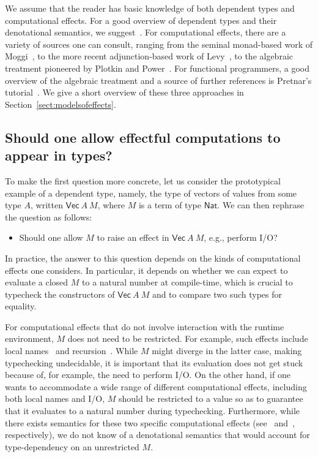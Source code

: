 We assume that the reader has basic knowledge of both dependent types and computational effects. For a good overview of dependent types and their denotational semantics, we suggest~\cite{Hofmann:SyntaxAndSemantics,Jacobs:Book,Streicher:Semantics}. 
For computational effects, there are a variety of sources one can consult, ranging from the seminal monad-based work of Moggi~\cite{Moggi:ComputationalLambdaCalculus,Moggi:NotionsofComputationandMonads}, to the more  recent adjunction-based work of Levy~\cite{Levy:CBPV}, to the algebraic treatment pioneered by Plotkin and Power~\cite{Plotkin:SemanticsForAlgOperations,Plotkin:NotionsOfComputation}. For functional programmers, a good overview of the algebraic treatment and a source of further references is Pretnar's tutorial~\cite{Pretnar:Tutorial}. 
We give a short overview of these three approaches 
in Section~\ref{sect:modelsofeffects}.

\subsection*{Should one allow effectful computations to appear in types?}

To make the first question more concrete, let us consider the prototypical example of a dependent type, namely, the type of vectors 
of values from some type $A$, written $\mathsf{Vec}~A~M$, where $M$ is a term of type $\mathsf{Nat}$. We can then rephrase the question as follows:
\begin{itemize}
\item Should one allow $M$ to raise an effect in $\mathsf{Vec}~A~M$, e.g., perform I/O?
\end{itemize}

In practice, the answer to this question depends on the kinds of computational effects one considers. In particular, it depends on whether we can expect to evaluate a closed $M$ to a natural number at compile-time, which is crucial to typecheck the constructors of $\mathsf{Vec}~A~M$ and to compare two such types for equality.

For computational effects that do not involve interaction with the runtime environment, $M$ does not need to be restricted. For example, such effects include local names~\cite{Pitts:NominalMLTT,Cheney:DepNomTypeTheory} and  recursion~\cite{Casinghino:CombiningProofs}. While $M$ might diverge in the latter case, making typechecking undecidable, it is important that its evaluation does not get stuck because of, for example, the need to perform I/O. On the other hand, if one wants to accommodate a wide range of different computational effects, including both local names and I/O, $M$ should be restricted to a value so as to guarantee that it evaluates to a natural number during typechecking.
Furthermore, while there exists semantics for these two specific computational effects (see~\cite{Pitts:NominalMLTT} and~\cite{Palmgren:DomainInterpretation}, respectively), we do not know of a denotational semantics that would account for type-dependency on an unrestricted $M$. 

